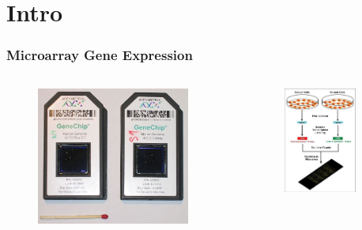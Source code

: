 \documentclass{beamer}
\begin{document}
\section{Intro}
\begin{frame}
  \frametitle{Microarray Gene Expression}
  \begin{columns}
    \begin{column}{0.5\textwidth}
      \begin{figure}
        \includegraphics[width=0.9\textwidth]{Affymetrix-microarray}
      \end{figure}
    \end{column}
    \begin{column}{0.5\textwidth}
      \begin{figure}
        \includegraphics[width=0.8\textwidth]{Microarray-schema}

\end{figure}
\end{column}
\end{columns}
\end{frame}
\end{document}
